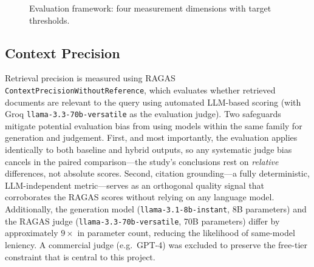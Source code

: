 \begin{figure}[H]
{%
}
\caption{Evaluation framework: four measurement dimensions with target thresholds.}
\label{fig:eval_framework}
\end{figure}

\subsection{Context Precision}

Retrieval precision is measured using RAGAS \texttt{ContextPrecisionWithoutReference}, which evaluates whether retrieved documents are relevant to the query using automated LLM-based scoring (with Groq \texttt{llama-3.3-70b-versatile} as the evaluation judge). Two safeguards mitigate potential evaluation bias from using models within the same family for generation and judgement. First, and most importantly, the evaluation applies identically to both baseline and hybrid outputs, so any systematic judge bias cancels in the paired comparison---the study's conclusions rest on \emph{relative} differences, not absolute scores. Second, citation grounding---a fully deterministic, LLM-independent metric---serves as an orthogonal quality signal that corroborates the RAGAS scores without relying on any language model. Additionally, the generation model (\texttt{llama-3.1-8b-instant}, 8B parameters) and the RAGAS judge (\texttt{llama-3.3-70b-versatile}, 70B parameters) differ by approximately $9{\times}$ in parameter count, reducing the likelihood of same-model leniency. A commercial judge (e.g.\ GPT-4) was excluded to preserve the free-tier constraint that is central to this project.

